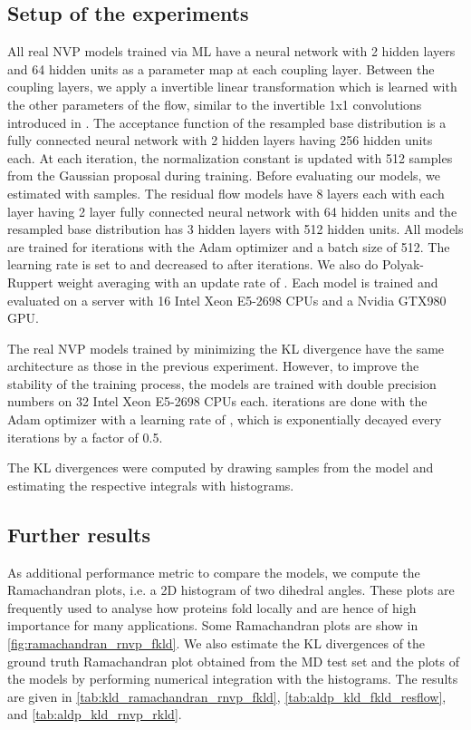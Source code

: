 \documentclass[twoside]{article}
\begin{document}
\subsection{Setup of the experiments}
\label{sec:aldp_setup}

All real NVP models trained via ML have a neural network with 2 hidden layers and 64 hidden units as a parameter map at each coupling layer. Between the coupling layers, we apply a invertible linear transformation which is learned with the other parameters of the flow, similar to the invertible 1x1 convolutions introduced in \citep{Kingma2018}. The acceptance function of the resampled base distribution is a fully connected neural network with 2 hidden layers having 256 hidden units each. At each iteration, the normalization constant  is updated with 512 samples from the Gaussian proposal during training. Before evaluating our models, we estimated  with  samples. The residual flow models have 8 layers each with each layer having 2 layer fully connected neural network with 64 hidden units and the resampled base distribution has 3 hidden layers with 512 hidden units. All models are trained for  iterations with the Adam optimizer \citep{Kingma2015} and a batch size of 512. The learning rate is set to  and decreased to  after  iterations. We also do Polyak-Ruppert weight averaging \citep{Polyak1990,Ruppert1988} with an update rate of . Each model is trained and evaluated on a server with 16 Intel Xeon E5-2698 CPUs and a Nvidia GTX980 GPU.

The real NVP models trained by minimizing the KL divergence have the same architecture as those in the previous experiment. However, to improve the stability of the training process, the models are trained with double precision numbers on 32 Intel Xeon E5-2698 CPUs each.  iterations are done with the Adam optimizer with a learning rate of , which is exponentially decayed every  iterations by a factor of 0.5.

The KL divergences were computed by drawing  samples from the model and estimating the respective integrals with histograms.


\subsection{Further results}
\label{sec:aldp_further_results}

As additional performance metric to compare the models, we compute the Ramachandran plots, i.e. a 2D histogram of two dihedral angles. These plots are frequently used to analyse how proteins fold locally and are hence of high importance for many applications. Some Ramachandran plots are show in \autoref{fig:ramachandran_rnvp_fkld}. We also estimate the KL divergences of the ground truth Ramachandran plot obtained from the MD test set and the plots of the models by performing numerical integration with the histograms. The results are given in \autoref{tab:kld_ramachandran_rnvp_fkld}, \autoref{tab:aldp_kld_fkld_resflow}, and \autoref{tab:aldp_kld_rnvp_rkld}.
\end{document}
